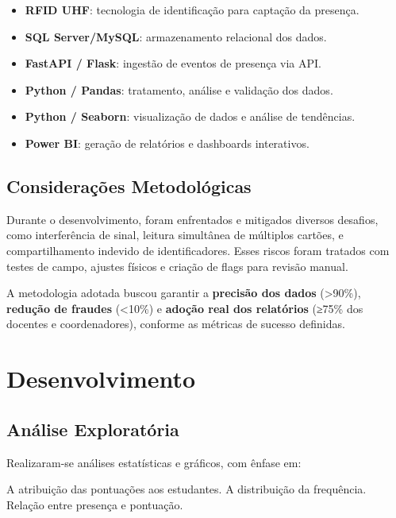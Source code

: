 \documentclass[
  letterpaper,
]{article}
\providecommand{\tightlist}{%
  \setlength{\itemsep}{0pt}\setlength{\parskip}{0pt}}
\begin{document}
\begin{itemize}
\tightlist
\item
  \textbf{RFID UHF}: tecnologia de identificação para captação da
  presença.
\item
  \textbf{SQL Server/MySQL}: armazenamento relacional dos dados.
\item
  \textbf{FastAPI / Flask}: ingestão de eventos de presença via API.
\item
  \textbf{Python / Pandas}: tratamento, análise e validação dos dados.
\item
  \textbf{Python / Seaborn}: visualização de dados e análise de
  tendências.
\item
  \textbf{Power BI}: geração de relatórios e dashboards interativos.
\end{itemize}

\section{Considerações
Metodológicas}\label{considerauxe7uxf5es-metodoluxf3gicas}

Durante o desenvolvimento, foram enfrentados e mitigados diversos
desafios, como interferência de sinal, leitura simultânea de múltiplos
cartões, e compartilhamento indevido de identificadores. Esses riscos
foram tratados com testes de campo, ajustes físicos e criação de flags
para revisão manual.

A metodologia adotada buscou garantir a \textbf{precisão dos dados}
(\textgreater90\%), \textbf{redução de fraudes} (\textless10\%) e
\textbf{adoção real dos relatórios} (≥75\% dos docentes e
coordenadores), conforme as métricas de sucesso definidas.


\chapter{Desenvolvimento}\label{desenvolvimento}

\section{Análise Exploratória}\label{anuxe1lise-exploratuxf3ria}

Realizaram-se análises estatísticas e gráficos, com ênfase em:

A atribuição das pontuações aos estudantes. A distribuição da
frequência. Relação entre presença e pontuação.
\end{document}
